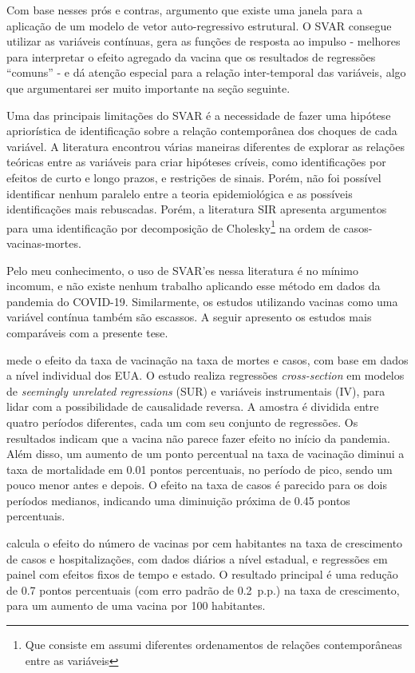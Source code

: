 \documentclass[
	12pt,				%
	oneside,			%
	a4paper,			%
	english,			%
	brazil				%
	hyperref = {colorlinks, citecolor=c1d, linkcolor=c2d, urlcolor=c3d, colorlinks}
	]{abntex2}
\newcounter{j}
\begin{document}
Com base nesses prós e contras, argumento que existe uma janela para a aplicação de um modelo de vetor auto-regressivo estrutural. O SVAR consegue utilizar as variáveis contínuas, gera as funções de resposta ao impulso - melhores para interpretar o efeito agregado da vacina que os resultados de regressões ``comuns'' - e dá atenção especial para a relação inter-temporal das variáveis, algo que argumentarei ser muito importante na seção seguinte.

Uma das principais limitações do SVAR é a necessidade de fazer uma hipótese apriorística de identificação sobre a relação contemporânea dos choques de cada variável. A literatura encontrou várias maneiras diferentes de explorar as relações teóricas entre as variáveis para criar hipóteses críveis, como identificações por efeitos de curto e longo prazos, e restrições de sinais. Porém, não foi possível identificar nenhum paralelo entre a teoria epidemiológica e as possíveis identificações mais rebuscadas. Porém, a literatura SIR apresenta argumentos para uma identificação por decomposição de Cholesky\footnote{Que consiste em assumi diferentes ordenamentos de relações contemporâneas entre as variáveis} na ordem de casos-vacinas-mortes. 

Pelo meu conhecimento, o uso de SVAR'es nessa literatura é no mínimo incomum, e não existe nenhum trabalho aplicando esse método em dados da pandemia do COVID-19. Similarmente, os estudos utilizando vacinas como uma variável contínua também são escassos. A seguir apresento os estudos mais comparáveis com a presente tese.

\textcite{Barro2022} mede o efeito da taxa de vacinação na taxa de mortes e casos, com base em dados a nível individual dos EUA. O estudo realiza regressões \textit{cross-section} em modelos de \textit{seemingly unrelated regressions} (SUR) e variáveis instrumentais (IV), para lidar com a possibilidade de causalidade reversa. A amostra é dividida entre quatro períodos diferentes, cada um com seu conjunto de regressões. Os resultados indicam que a vacina não parece fazer efeito no início da pandemia. Além disso, um aumento de um ponto percentual na taxa de vacinação diminui a taxa de mortalidade em 0.01 pontos percentuais, no período de pico, sendo um pouco menor antes e depois. O efeito na taxa de casos é parecido para os dois períodos medianos, indicando uma diminuição próxima de 0.45 pontos percentuais.

\textcite{Chen2022} calcula o efeito do número de vacinas por cem habitantes na taxa de crescimento de casos e hospitalizações, com dados diários a nível estadual, e regressões em painel com efeitos fixos de tempo e estado. O resultado principal é uma redução de 0.7 pontos percentuais (com erro padrão de 0.2\ p.p.) na taxa de crescimento, para um aumento de uma vacina por 100 habitantes.
\end{document}
